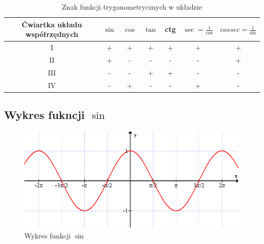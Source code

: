 \documentclass[a4paper]{article}
\begin{document}
\begin{table}[h]

\label{tab:Tabelka2}
\centering
\begin{tabular}{|c|c|c|c|c|c|c|}

\hline
Ćwiartka układu współrzędnych & $ \sin$ & $\cos$ & $\tan$ & ctg & $\sec = \frac{1}{\cos}$ & $cossec = \frac{1}{\sin}$ \\
\hline
I &{\color{red} +} & {\color{red} +} & {\color{red} +} & {\color{red} +} & {\color{red} +} & {\color{red} +} \\
\hline
II & {\color{red} +} & {\color{blue} -} & {\color{blue} -} & {\color{blue} -} & {\color{blue} -} & {\color{red} +} \\
\hline
III & {\color{blue} -} & {\color{blue} -} & {\color{red} +} & {\color{red} +} & {\color{blue} -} & {\color{blue} -} \\
\hline
IV & {\color{blue} -} & {\color{red} +} & {\color{blue} -} & {\color{blue} -} & {\color{red} +} & {\color{blue} -} \\
 \hline
\end{tabular}
\caption{Znak funkcji trygonometrycznych w układzie}%
\end{table}
\newpage
\subsection{Wykres fukncji $\sin$}
\begin{figure}[!ht]
\label{obrazek}
\centering
\includegraphics[scale=0.4]{projekt.png}
\caption{Wykres funkcji $\sin$}%
\end{figure}
\end{document}

